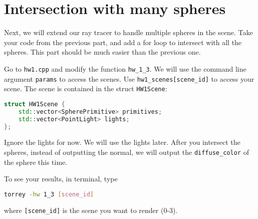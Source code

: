 \section{Intersection with many spheres}
Next, we will extend our ray tracer to handle multiple spheres in the scene. Take your code from the previous part, and add a for loop to intersect with all the spheres. This part should be much easier than the previous one. 

Go to \lstinline{hw1.cpp} and modify the function \lstinline{hw_1_3}. We will use the command line argument \lstinline{params} to access the scenes. Use \lstinline{hw1_scenes[scene_id]} to access your scene. The scene is contained in the struct \lstinline{HW1Scene}:
\begin{lstlisting}[language=C++]
struct HW1Scene {
    std::vector<SpherePrimitive> primitives;
    std::vector<PointLight> lights; 
};
\end{lstlisting}
Ignore the lights for now. We will use the lights later.
After you intersect the spheres, instead of outputting the normal, we will output the \lstinline{diffuse_color} of the sphere this time.

To see your results, in terminal, type
\begin{lstlisting}[language=bash]
  torrey -hw 1_3 [scene_id]
\end{lstlisting}
where \lstinline{[scene_id]} is the scene you want to render (0-3).

%
%


